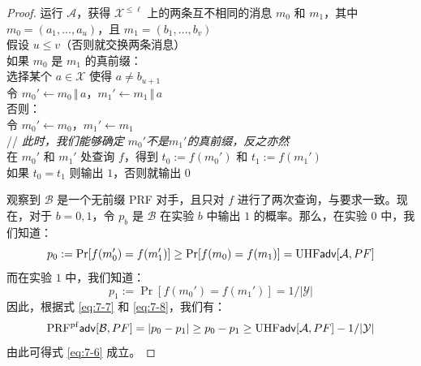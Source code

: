 \begin{proof}
\hspace*{5pt} 运行 $\mathcal{A}$，获得 $\mathcal{X}^{\leq\ell}$ 上的两条互不相同的消息 $m_0$ 和 $m_1$，其中\\
\hspace*{50pt} $m_0=(a_1,\dots,a_u)$，且 $m_1=(b_1,\dots,b_v)$\\
\hspace*{26pt} 假设 $u\leq v$（否则就交换两条消息）\\
\hspace*{26pt} 如果 $m_0$ 是 $m_1$ 的真前缀：\\
\hspace*{50pt} 选择某个 $a\in\mathcal{X}$ 使得 $a\neq b_{u+1}$\\
\hspace*{50pt} 令 $m_0'\leftarrow m_0\,\Vert\,a$，$m_1'\leftarrow m_1\,\Vert\,a$\\
\hspace*{26pt} 否则：\\
\hspace*{50pt} 令 $m_0'\leftarrow m_0$，$m_1'\leftarrow m_1$\\
\hspace*{26pt} // \emph{此时，我们能够确定 $m_0'$不是$m_1'$的真前缀，反之亦然}\\
\hspace*{26pt} 在 $m_0'$ 和 $m_1'$ 处查询 $f$，得到 $t_0:=f(m_0')$ 和 $t_1:=f(m_1')$\\
\hspace*{26pt} 如果 $t_0=t_1$ 则输出 $1$，否则就输出 $0$

\vspace{5pt}

观察到 $\mathcal{B}$ 是一个无前缀 PRF 对手，且只对 $f$ 进行了两次查询，与要求一致。现在，对于 $b=0,1$，令 $p_b$ 是 $\mathcal{B}$ 在实验 $b$ 中输出 $1$ 的概率。那么，在实验 $0$ 中，我们知道：
\begin{equation}\label{eq:7-7}
p_0:=\Pr[f(m_0')=f(m_1')]\geq\Pr[f(m_0)=f(m_1)]={\rm UHF}\mathsf{adv}[\mathcal{A},PF]
\end{equation}
而在实验 $1$ 中，我们知道：
\begin{equation}\label{eq:7-8}
p_1:=\Pr[f(m_0')=f(m_1')]={1}/{|\mathcal{Y}|}
\end{equation}
因此，根据式 \ref{eq:7-7} 和 \ref{eq:7-8}，我们有：
\[
{\rm PRF^{pf}}\mathsf{adv}[\mathcal{B},PF]=|p_0-p_1|\geq p_0-p_1\geq{\rm UHF}\mathsf{adv}[\mathcal{A},PF]-{1}/{|\mathcal{Y}|}
\]
由此可得式 \ref{eq:7-6} 成立。
\end{proof}

